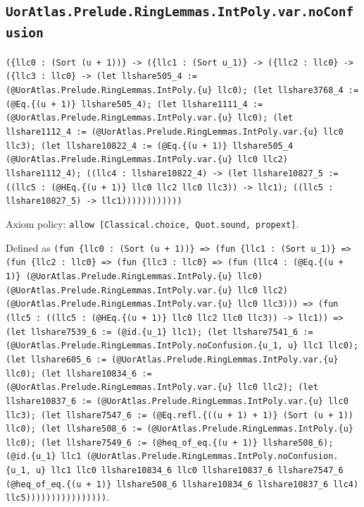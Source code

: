 \documentclass[11pt]{article}
\begin{document}
\subsection*{\texttt{UorAtlas.Prelude.RingLemmas.IntPoly.var.noConfusion}}
\noindent\texttt{(\{llc0 : (Sort (u + 1))\} -> (\{llc1 : (Sort u\_1)\} -> (\{llc2 : llc0\} -> (\{llc3 : llc0\} -> (let llshare505\_4 := (@UorAtlas.Prelude.RingLemmas.IntPoly.\{u\} llc0); (let llshare3768\_4 := (@Eq.\{(u + 1)\} llshare505\_4); (let llshare1111\_4 := (@UorAtlas.Prelude.RingLemmas.IntPoly.var.\{u\} llc0); (let llshare1112\_4 := (@UorAtlas.Prelude.RingLemmas.IntPoly.var.\{u\} llc0 llc3); (let llshare10822\_4 := (@Eq.\{(u + 1)\} llshare505\_4 (@UorAtlas.Prelude.RingLemmas.IntPoly.var.\{u\} llc0 llc2) llshare1112\_4); ((llc4 : llshare10822\_4) -> (let llshare10827\_5 := ((llc5 : (@HEq.\{(u + 1)\} llc0 llc2 llc0 llc3)) -> llc1); ((llc5 : llshare10827\_5) -> llc1))))))))))))}\par
\noindent Axiom policy: \texttt{allow [Classical.choice, Quot.sound, propext]}.\par
\noindent Defined as \texttt{(fun \{llc0 : (Sort (u + 1))\} => (fun \{llc1 : (Sort u\_1)\} => (fun \{llc2 : llc0\} => (fun \{llc3 : llc0\} => (fun (llc4 : (@Eq.\{(u + 1)\} (@UorAtlas.Prelude.RingLemmas.IntPoly.\{u\} llc0) (@UorAtlas.Prelude.RingLemmas.IntPoly.var.\{u\} llc0 llc2) (@UorAtlas.Prelude.RingLemmas.IntPoly.var.\{u\} llc0 llc3))) => (fun (llc5 : ((llc5 : (@HEq.\{(u + 1)\} llc0 llc2 llc0 llc3)) -> llc1)) => (let llshare7539\_6 := (@id.\{u\_1\} llc1); (let llshare7541\_6 := (@UorAtlas.Prelude.RingLemmas.IntPoly.noConfusion.\{u\_1, u\} llc1 llc0); (let llshare605\_6 := (@UorAtlas.Prelude.RingLemmas.IntPoly.var.\{u\} llc0); (let llshare10834\_6 := (@UorAtlas.Prelude.RingLemmas.IntPoly.var.\{u\} llc0 llc2); (let llshare10837\_6 := (@UorAtlas.Prelude.RingLemmas.IntPoly.var.\{u\} llc0 llc3); (let llshare7547\_6 := (@Eq.refl.\{((u + 1) + 1)\} (Sort (u + 1)) llc0); (let llshare508\_6 := (@UorAtlas.Prelude.RingLemmas.IntPoly.\{u\} llc0); (let llshare7549\_6 := (@heq\_of\_eq.\{(u + 1)\} llshare508\_6); (@id.\{u\_1\} llc1 (@UorAtlas.Prelude.RingLemmas.IntPoly.noConfusion.\{u\_1, u\} llc1 llc0 llshare10834\_6 llc0 llshare10837\_6 llshare7547\_6 (@heq\_of\_eq.\{(u + 1)\} llshare508\_6 llshare10834\_6 llshare10837\_6 llc4) llc5))))))))))))))))}.\par
\end{document}
